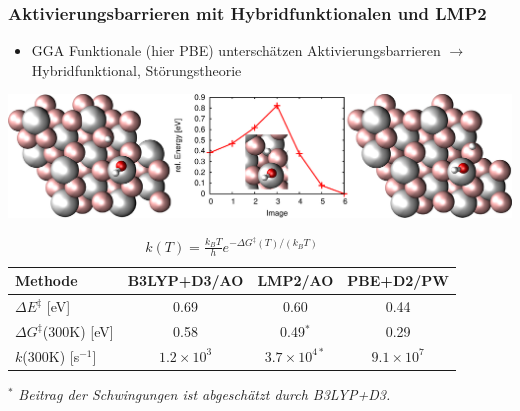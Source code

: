 \documentclass[hyperref={pdfpagelabels=false}]{beamer}
\begin{document}
\begin{frame}
 \frametitle{Aktivierungsbarrieren mit Hybridfunktionalen und LMP2}
 \begin{itemize}
  \item GGA Funktionale (hier PBE) unterschätzen Aktivierungsbarrieren $\rightarrow$ Hybridfunktional, Störungstheorie
 \end{itemize}
 \centering
   \includegraphics[width=.75\textwidth]{figures/df-h-4-2.pdf}
     \vspace{-.2cm}
     \pause
\begin{table}[!h]
  \centering
  \caption{$k(T)=\frac{k_BT}{h}e^{-\Delta G^\ddagger(T)/(k_BT)}$}
  \vspace{-.5cm}
  \begin{tabular}{l|cc|c}%
  \toprule
    Methode& B3LYP+D3/AO&LMP2/AO &PBE+D2/PW\\\midrule
   $\Delta E^\ddagger$ [eV] &0.69 & 0.60&0.44\\
   $\Delta G^\ddagger$(300K) [eV]&0.58 & 0.49$^\ast$ &0.29\\
   $k$(300K) [s$^{-1}$]&$1.2\times 10^3$ & $3.7\times 10^{4\ast}$&$9.1\times 10^7$\\\bottomrule 
  \end{tabular}
\end{table}
$^\ast$ \textit{Beitrag der Schwingungen ist abgeschätzt durch B3LYP+D3.}
 \centering
\end{frame} 

\end{document}
